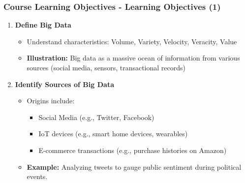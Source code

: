 \documentclass[aspectratio=169]{beamer}
\begin{document}
\begin{frame}[fragile]
    \frametitle{Course Learning Objectives - Learning Objectives (1)}
    \begin{enumerate}
        \item \textbf{Define Big Data}
            \begin{itemize}
                \item Understand characteristics: Volume, Variety, Velocity, Veracity, Value
                \item \textbf{Illustration:} Big data as a massive ocean of information from various sources (social media, sensors, transactional records)
            \end{itemize}
        
        \item \textbf{Identify Sources of Big Data}
            \begin{itemize}
                \item Origins include:
                    \begin{itemize}
                        \item Social Media (e.g., Twitter, Facebook)
                        \item IoT devices (e.g., smart home devices, wearables)
                        \item E-commerce transactions (e.g., purchase histories on Amazon)
                    \end{itemize}
                \item \textbf{Example:} Analyzing tweets to gauge public sentiment during political events.
            \end{itemize}
    \end{enumerate}
\end{frame}
\end{document}
